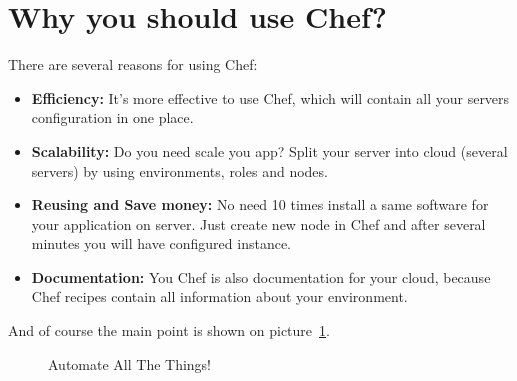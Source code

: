 \section{Why you should use Chef?}

There are several reasons for using Chef:

\begin{itemize}
  \item \textbf{Efficiency:} It's more effective to use Chef, which will contain all your servers configuration in one place.
  \item \textbf{Scalability:} Do you need scale you app? Split your server into cloud (several servers) by using environments, roles and nodes.
  \item \textbf{Reusing and Save money:} No need 10 times install a same software for your application on server. Just create new node in Chef and after several minutes you will have configured instance.
  \item \textbf{Documentation:} You Chef is also documentation for your cloud, because Chef recipes contain all information about your environment.
\end{itemize}

And of course the main point is shown on picture~\ref{fig:automate-all-the-things}.

\begin{figure}[ht!]
  \caption{Automate All The Things!}
  \label{fig:automate-all-the-things}
\end{figure}
